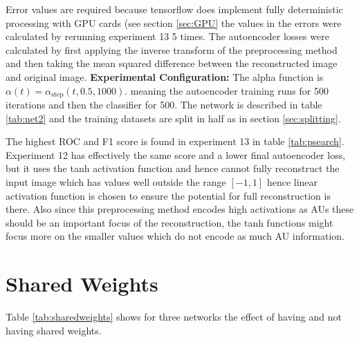 \begin{table}[!h]
{{              Error values are required because tensorflow does implement fully deterministic
              processing with GPU cards (see section \ref{sec:GPU} the values in the errors were
              calculated by rerunning experiment 13 5 times. The autoencoder losses were calculated
              by first applying the inverse transform of the preprocessing method and then taking the mean squared
              difference between the reconstructed image and original image. {\bf Experimental Configuration:}
              The alpha function is $\alpha(t)=\alpha_{\text{step}}(t,0.5,1000)$.
              meaning the autoencoder training runs for 500 iterations and then the classifier for 500.
              The network is described in table \ref{tab:net2} and the training datasets are split in half as in section
              \ref{sec:splitting}.}
          \label{tab:psearch} }
          \end{table}

          The highest ROC and F1 score is found in experiment 13 in table \ref{tab:psearch}. Experiment 12
          has effectively the same score and a lower final autoencoder loss, but it uses the tanh activation
          function and hence cannot fully reconstruct the input image which has values well outside the
          range $[-1,1]$ hence linear activation function is chosen to ensure the potential for full reconstruction is there.
          Also since this preprocessing method encodes high activations as AUs these should be
          an important focus of the reconstruction, the tanh functions might focus more on the smaller values which
          do not encode as much AU information.

        \newpage
        \section{Shared Weights}

          Table \ref{tab:sharedweights} shows
          for three networks the effect of having and not having shared weights.

